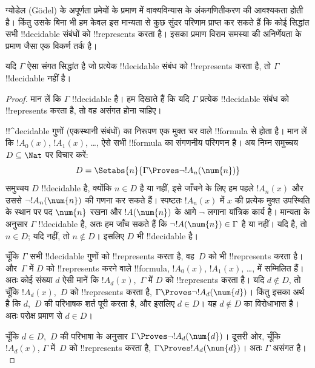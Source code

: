 \documentclass[../../../include/open-logic-section]{subfiles}
\begin{document}


ग्योडेल (G\"odel) के अपूर्णता प्रमेयों के प्रमाण में वाक्यविन्यास के
अंकगणितीकरण की आवश्यकता होती है। किंतु उसके बिना भी हम केवल इस मान्यता से
कुछ सुंदर परिणाम प्राप्त कर सकते हैं कि कोई सिद्धांत सभी !!{decidable}
संबंधों को !!{represents} करता है। इसका प्रमाण विराम समस्या की अनिर्णेयता के
प्रमाण जैसा एक विकर्ण तर्क है।

\begin{thm}
यदि $\Gamma$ ऐसा संगत सिद्धांत है जो प्रत्येक !!{decidable} संबंध को
!!{represents} करता है, तो $\Gamma$ !!{decidable} नहीं है।
\end{thm}

\begin{proof}
मान लें कि $\Gamma$ !!{decidable} है। हम दिखाते हैं कि यदि $\Gamma$ प्रत्येक
!!{decidable} संबंध को !!{represents} करता है, तो वह असंगत होना चाहिए।

!!^{decidable} गुणों (एकस्थानी संबंधों) का निरूपण एक मुक्त चर वाले
!!{formula} से होता है। मान लें कि $!A_0(x)$, $!A_1(x)$, \dots, ऐसे सभी
!!{formula} का संगणनीय परिगणन है। अब निम्न समुच्चय $D \subseteq \Nat$ पर
विचार करें:
\[
D = \Setabs{n}{\Gamma \Proves \lnot !A_n(\num{n})}
\]
समुच्चय $D$ !!{decidable} है, क्योंकि $n \in D$ है या नहीं, इसे जाँचने के
लिए हम पहले $!A_n(x)$ और उससे $\lnot !A_n(\num{n})$ की गणना कर सकते हैं।
स्पष्टतः $!A_n(x)$ में $x$ की प्रत्येक मुक्त उपस्थिति के स्थान पर पद
$\num{n}$ रखना और $!A(\num{n})$ के आगे $\lnot$ लगाना यांत्रिक कार्य है।
मान्यता के अनुसार $\Gamma$ !!{decidable} है, अतः हम जाँच सकते हैं कि $\lnot
!A(\num{n}) \in \Gamma$ है या नहीं। यदि है, तो $n \in D$; यदि नहीं, तो $n
\notin D$। इसलिए $D$ भी !!{decidable} है।

चूँकि $\Gamma$ सभी !!{decidable} गुणों को !!{represents} करता है, वह~$D$ को
भी !!{represents} करता है। और~$\Gamma$ में $D$ को !!{represents} करने वाले
!!{formula}, $!A_0(x)$, $!A_1(x)$, \dots, में सम्मिलित हैं। अतः कोई संख्या
$d$ ऐसी मानें कि $!A_d(x)$,~$\Gamma$ में $D$ को !!{represents} करता है। यदि
$d \notin D$, तो चूँकि $!A_d(x)$,~$D$ को !!{represents} करता है, $\Gamma
\Proves \lnot !A_d(\num{d})$। किंतु इसका अर्थ है कि $d$,~$D$ की परिभाषक
शर्त पूरी करता है, और इसलिए $d \in D$। यह $d \notin D$ का विरोधाभास है। अतः
परोक्ष प्रमाण से $d \in D$।

चूँकि $d \in D$,~$D$ की परिभाषा के अनुसार $\Gamma \Proves \lnot
!A_d(\num{d})$। दूसरी ओर, चूँकि $!A_d(x)$, $\Gamma$ में~$D$ को
!!{represents} करता है, $\Gamma \Proves !A_d(\num{d})$। अतः $\Gamma$ असंगत
है।
\end{proof}
\end{document}
